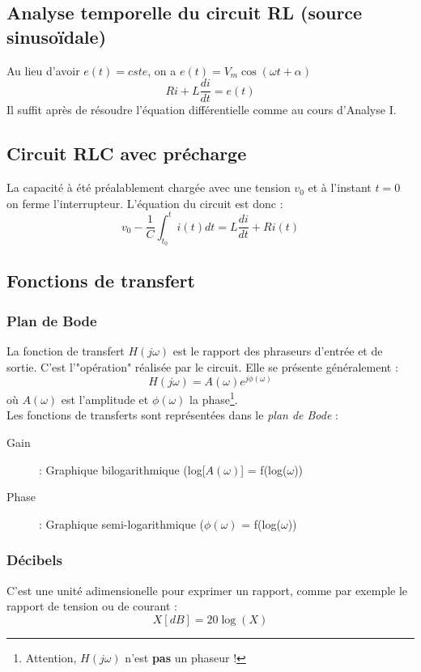 \documentclass	[11pt, a4paper, openany]{book}
\begin{document}
\subsection{Analyse temporelle du circuit RL (source sinusoïdale)}
Au lieu d'avoir $e(t) = cste$, on a $e(t) = V_m\cos(\omega t + \alpha)$
\begin{equation}
Ri + L\frac{di}{dt} = e(t)
\end{equation}
Il suffit après de résoudre l'équation différentielle comme au cours d'Analyse I.

\subsection{Circuit RLC avec précharge}
La capacité à été préalablement chargée avec une tension $v_0$ et à l'instant $t=0$ on ferme l'interrupteur. L'équation du circuit est donc :
\begin{equation}
v_0 - \frac{1}{C}\int_{t_0}^t i(t)dt = L\frac{di}{dt} + Ri(t)
\end{equation}


\subsection{Fonctions de transfert}
\subsubsection{Plan de Bode}
La fonction de transfert $H(j\omega)$ est le rapport des phraseurs d'entrée et de sortie. C'est l'"opération" réalisée par le circuit. Elle se présente généralement :
\begin{equation}
H(j\omega) = A(\omega)e^{j\phi(\omega)}
\end{equation}
où $A(\omega)$ est l'amplitude et $\phi(\omega)$ la phase\footnote{Attention, $H(j\omega)$ n'est \textbf{pas} un phaseur !}.\\

Les fonctions de transferts sont représentées dans le \textit{plan de Bode} :
\begin{description}
\item[Gain] : Graphique bilogarithmique (log[$A(\omega)$] = f(log($\omega$))
\item[Phase]: Graphique semi-logarithmique ($\phi(\omega)$ = f(log($\omega$))
\end{description}

\subsubsection{Décibels}
C'est une unité adimensionelle pour exprimer un rapport, comme par exemple le rapport de tension ou de courant :
\begin{equation}
X[dB] = 20\log(X)
\end{equation}
\end{document}
